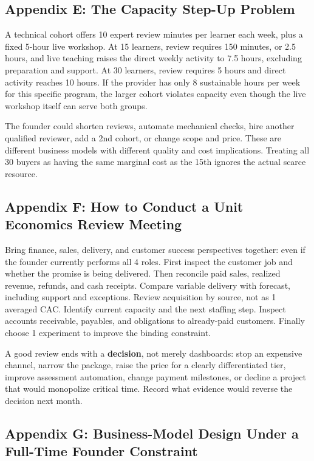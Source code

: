 \subsection*{Appendix E: The Capacity Step-Up Problem}

A technical cohort offers 10 expert review minutes per learner each week, plus a fixed 5-hour live workshop. At 15 learners, review requires 150 minutes, or 2.5 hours, and live teaching raises the direct weekly activity to 7.5 hours, excluding preparation and support. At 30 learners, review requires 5 hours and direct activity reaches 10 hours. If the provider has only 8 sustainable hours per week for this specific program, the larger cohort violates capacity even though the live workshop itself can serve both groups.

The founder could shorten reviews, automate mechanical checks, hire another qualified reviewer, add a 2nd cohort, or change scope and price. These are different business models with different quality and cost implications. Treating all 30 buyers as having the same marginal cost as the 15th ignores the actual scarce resource.

\subsection*{Appendix F: How to Conduct a Unit Economics Review Meeting}

Bring finance, sales, delivery, and customer success perspectives together: even if the founder currently performs all 4 roles. First inspect the customer job and whether the promise is being delivered. Then reconcile paid sales, realized revenue, refunds, and cash receipts. Compare variable delivery with forecast, including support and exceptions. Review acquisition by source, not as 1 averaged CAC. Identify current capacity and the next staffing step. Inspect accounts receivable, payables, and obligations to already-paid customers. Finally choose 1 experiment to improve the binding constraint.

A good review ends with a \textbf{decision}, not merely dashboards: stop an expensive channel, narrow the package, raise the price for a clearly differentiated tier, improve assessment automation, change payment milestones, or decline a project that would monopolize critical time. Record what evidence would reverse the decision next month.

\subsection*{Appendix G: Business-Model Design Under a Full-Time Founder Constraint}

